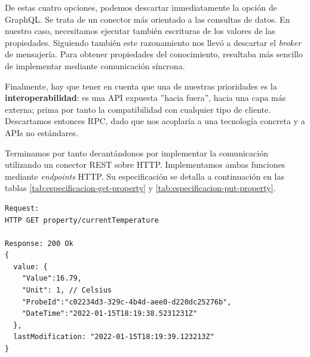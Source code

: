 De estas cuatro opciones, podemos descartar inmediatamente la opción de GraphQL. Se trata de un conector más orientado a las consultas de datos. En nuestro caso, necesitamos ejecutar también escrituras de los valores de las propiedades. Siguiendo también este razonamiento nos llevó a descartar el \textit{broker} de mensajería. Para obtener propiedades del conocimiento, resultaba más sencillo de implementar mediante comunicación síncrona.

Finalmente, hay que tener en cuenta que una de nuestras prioridades es la \textbf{interoperabilidad}: es una API expuesta ''hacia fuera'', hacia una capa más externa; prima por tanto la compatibilidad con cualquier tipo de cliente. Descartamos entonces RPC, dado que nos acoplaría a una tecnología concreta y a APIs no estándares.

Terminamos por tanto decantándonos por implementar la comunicación utilizando un conector REST sobre HTTP. Implementamos ambas funciones mediante \textit{endpoints} HTTP. Su especificación se detalla a continuación en las tablas \ref{tab:especificacion-get-property} y \ref{tab:especificacion-put-property}.

\newsavebox\getpropertyrequestbox
\begin{lrbox}{\getpropertyrequestbox}
  \begin{minipage}[t]{1in}
    \begin{verbatim}
Request:
HTTP GET property/currentTemperature

Response: 200 Ok
{
  value: {
    "Value":16.79,
    "Unit": 1, // Celsius
    "ProbeId":"c02234d3-329c-4b4d-aee0-d220dc25276b",
    "DateTime":"2022-01-15T18:19:38.5231231Z"
  },
  lastModification: "2022-01-15T18:19:39.123213Z"
}
    \end{verbatim}
  \end{minipage}
\end{lrbox}


